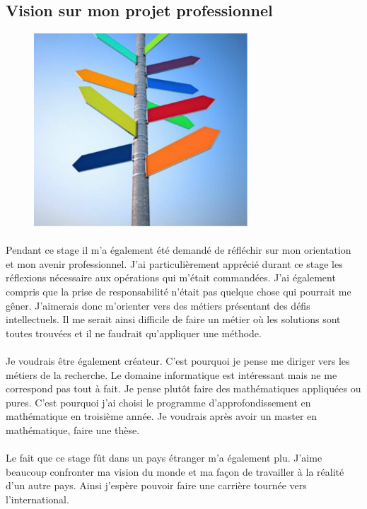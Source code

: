 \subsection{Vision sur mon projet professionnel}
\begin{figure}
\includegraphics[width=8cm]{image/directions.png}
\end{figure}
\paragraph{}
Pendant ce stage il m'a également été demandé de réfléchir sur mon orientation et mon avenir professionnel. J'ai particulièrement apprécié durant ce stage les réflexions nécessaire aux opérations qui m'était commandées. J'ai également compris que la prise de responsabilité n'était pas quelque chose qui pourrait me gêner. J'aimerais donc m'orienter vers des métiers présentant des défis intellectuels. Il me serait ainsi difficile de faire un métier où les solutions sont toutes trouvées et il ne faudrait qu'appliquer une méthode.

\paragraph{}
Je voudrais être également créateur. C'est pourquoi je pense me diriger vers les métiers de la recherche. Le domaine informatique est intéressant mais ne me correspond pas tout à fait. Je pense plutôt faire des mathématiques appliquées ou pures. C'est pourquoi j'ai choisi le programme d'approfondissement en mathématique en troisième année. Je voudrais après avoir un master en mathématique, faire une thèse.

\paragraph{}
Le fait que ce stage fût dans un pays étranger m'a également plu. J'aime beaucoup confronter ma vision du monde et ma façon de travailler à la réalité d'un autre pays. Ainsi j'espère pouvoir faire une carrière tournée vers l'international.
